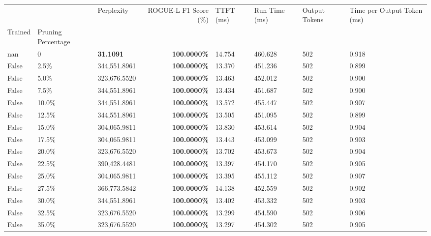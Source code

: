 \begin{table}[H]
\label{tab:evaluation-pipeline-11-untrained}
\begin{tabular}{lllrllll}
\toprule
 &  & Perplexity & ROGUE-L F1 Score (\%) & TTFT (ms) & Run Time (ms) & Output Tokens & Time per Output Token (ms) \\
Trained & Pruning Percentage &  &  &  &  &  &  \\
\midrule
nan & 0 & \bfseries 31.1091 & \bfseries 100.0000\% & 14.754 & 460.628 & 502 & 0.918 \\
\cline{1-8}
False & 2.5\% & 344,551.8961 & \bfseries \color{red} 100.0000\% & 13.370 & 451.236 & 502 & 0.899 \\
\cline{1-8}
False & 5.0\% & 323,676.5520 & \bfseries \color{red} 100.0000\% & 13.463 & 452.012 & 502 & 0.900 \\
\cline{1-8}
False & 7.5\% & 344,551.8961 & \bfseries \color{red} 100.0000\% & 13.434 & 451.687 & 502 & 0.900 \\
\cline{1-8}
False & 10.0\% & 344,551.8961 & \bfseries \color{red} 100.0000\% & 13.572 & 455.447 & 502 & 0.907 \\
\cline{1-8}
False & 12.5\% & 344,551.8961 & \bfseries \color{red} 100.0000\% & 13.505 & 451.095 & 502 & 0.899 \\
\cline{1-8}
False & 15.0\% & \color{red} 304,065.9811 & \bfseries \color{red} 100.0000\% & 13.830 & 453.614 & 502 & 0.904 \\
\cline{1-8}
False & 17.5\% & \color{red} 304,065.9811 & \bfseries \color{red} 100.0000\% & 13.443 & 453.099 & 502 & 0.903 \\
\cline{1-8}
False & 20.0\% & 323,676.5520 & \bfseries \color{red} 100.0000\% & 13.702 & 453.673 & 502 & 0.904 \\
\cline{1-8}
False & 22.5\% & 390,428.4481 & \bfseries \color{red} 100.0000\% & 13.397 & 454.170 & 502 & 0.905 \\
\cline{1-8}
False & 25.0\% & \color{red} 304,065.9811 & \bfseries \color{red} 100.0000\% & 13.395 & 455.112 & 502 & 0.907 \\
\cline{1-8}
False & 27.5\% & 366,773.5842 & \bfseries \color{red} 100.0000\% & 14.138 & 452.559 & 502 & 0.902 \\
\cline{1-8}
False & 30.0\% & 344,551.8961 & \bfseries \color{red} 100.0000\% & 13.402 & 453.332 & 502 & 0.903 \\
\cline{1-8}
False & 32.5\% & 323,676.5520 & \bfseries \color{red} 100.0000\% & 13.299 & 454.590 & 502 & 0.906 \\
\cline{1-8}
False & 35.0\% & 323,676.5520 & \bfseries \color{red} 100.0000\% & 13.297 & 454.302 & 502 & 0.905 \\

\end{tabular}
\end{table}
